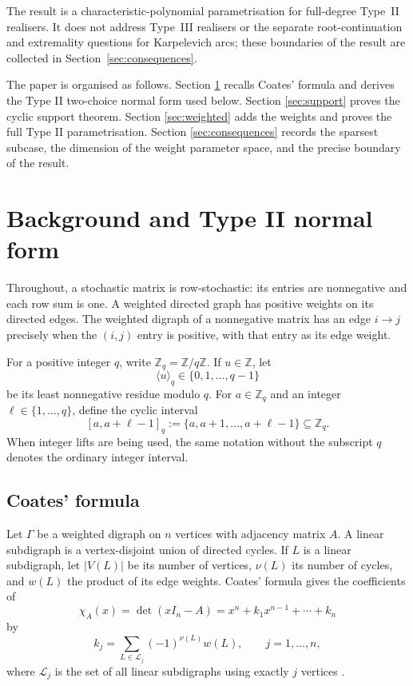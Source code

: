 \documentclass[11pt]{article}
\theoremstyle{definition}
\theoremstyle{remark}
\begin{document}
The result is a characteristic-polynomial parametrisation for full-degree Type~II realisers. It does not address Type~III realisers or the separate root-continuation and extremality questions for Karpelevich arcs; these boundaries of the result are collected in Section~\ref{sec:consequences}.

The paper is organised as follows. Section \ref{sec:background} recalls Coates' formula and derives the Type II two-choice normal form used below. Section \ref{sec:support} proves the cyclic support theorem. Section \ref{sec:weighted} adds the weights and proves the full Type II parametrisation. Section \ref{sec:consequences} records the sparsest subcase, the dimension of the weight parameter space, and the precise boundary of the result.

\section{Background and Type II normal form}
\label{sec:background}

Throughout, a stochastic matrix is row-stochastic: its entries are nonnegative and each row sum is one.  A weighted directed graph has positive weights on its directed edges.  The weighted digraph of a nonnegative matrix has an edge $i\to j$ precisely when the $(i,j)$ entry is positive, with that entry as its edge weight.

For a positive integer $q$, write $\mathbb Z_q=\mathbb Z/q\mathbb Z$.  If $u\in\mathbb Z$, let
\[
        \langle u\rangle_q\in\{0,1,\ldots,q-1\}
\]
be its least nonnegative residue modulo $q$.  For $a\in\mathbb Z_q$ and an integer $\ell\in\{1,\ldots,q\}$, define the cyclic interval
\[
        [a,a+\ell-1]_q:=\{a,a+1,\ldots,a+\ell-1\}\subseteq\mathbb Z_q .
\]
When integer lifts are being used, the same notation without the subscript $q$ denotes the ordinary integer interval.

\subsection{Coates' formula}

Let $\Gamma$ be a weighted digraph on $n$ vertices with adjacency matrix $A$. A linear subdigraph is a vertex-disjoint union of directed cycles. If $L$ is a linear subdigraph, let $|V(L)|$ be its number of vertices, $\nu(L)$ its number of cycles, and $w(L)$ the product of its edge weights. Coates' formula gives the coefficients of
\[
        \chi_A(x)=\det(xI_n-A)=x^n+k_1x^{n-1}+\cdots+k_n
\]
by
\begin{equation}
        k_j=\sum_{L\in\mathcal L_j}(-1)^{\nu(L)}w(L),
        \qquad j=1,\ldots,n,
        \label{eq:coates}
\end{equation}
where $\mathcal L_j$ is the set of all linear subdigraphs using exactly $j$ vertices \cite{Coates1959}.
\end{document}
